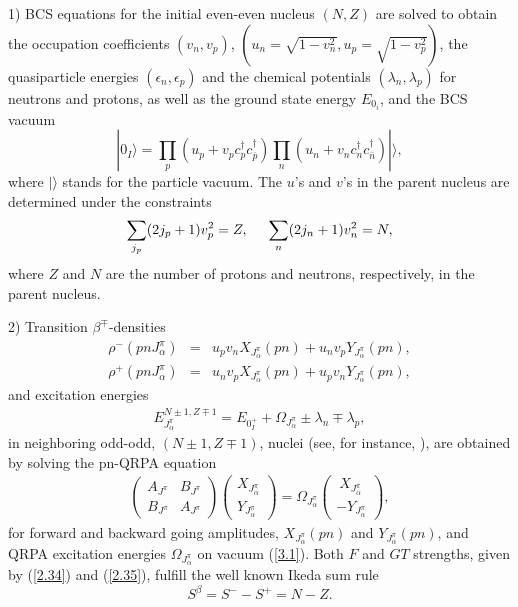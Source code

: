 \documentclass[nofootinbib,twocolumn,eqsecnum,floats,aps]{revtex4}
\def\e {{\epsilon}}
\def\nn{\nonumber }
\def\nn{\nonumber }
\def\be{\begin{equation}}
\def\ee{\end{equation}}
\def\br{\begin{eqnarray}}
\def\e {{\epsilon}}
\def\ket#1{|#1 \rangle}
\def\rf#1{{(\ref{#1})}}
\def\a {{\alpha}}
\def\b {{\beta}}
\begin{document}
1)  BCS equations  for the initial  even-even nucleus $(N,Z)$ are solved to obtain
the occupation coefficients $(v_n,v_p)$, $(u_n=\sqrt{1-v_n^2},u_p=\sqrt{1-v_p^2})$, the quasiparticle energies $(\e_n,\e_p)$
and the chemical potentials $(\lambda_n,\lambda_p)$ for  neutrons and protons, as well as the ground state energy  $E_{0_i}$,
and the BCS vacuum
\be
\ket{0_I}=\prod_p(u_p+v_pc_p^\dag c_{\bar p}^\dag)\prod_n(u_n+v_nc_n^\dag c_{\bar n}^\dag)\ket{},
\label{3.1} \ee
 where $\ket{}$ stands for the particle vacuum. The $u$'s and $v$'s in the parent  nucleus are determined under the constraints
\be
\sum_{j_p}(2j_p+1) v_{p}^2=Z,\hspace{0.5cm}\sum_{n}(2j_n+1) v_{n}^2=N,
\label{3.2} \ee
where $Z$ and $N$ are the number of protons and neutrons, respectively, in the parent nucleus.%

2) Transition $\b^\mp $-densities
\begin{eqnarray}
\rho^{-}(pnJ_\a^\pi)&=&u_{p}v_{n}X_{J_\a^\pi}(pn)+u_{n}v_{p}Y_{J_\a^\pi}(pn),
\nn\\
\rho^{+}(pnJ_\a^\pi)&=&u_{n}v_{p}X_{J_\a^\pi}(pn)+u_pv_nY_{J_\a^\pi}(pn),
\label{3.3}
\end{eqnarray}
and  excitation energies
\br
E^{N\pm 1,Z\mp 1}_{J_\a^\pi}=E_{0^+_I}+\Omega _{J^\pi_{\a}}\pm \lambda_n\mp \lambda_p,
\label{3.4}
\end{eqnarray}
in  neighboring odd-odd, $(N\pm1,Z\mp1)$,  nuclei (see, for instance, \cite[Sec. 6.3.4]{Ri80}),
are obtained by solving the pn-QRPA equation
\begin{eqnarray}
\left(\begin{array}{ll} A_{J^\pi} & B_{J^\pi} \\  B_{J^\pi} &
A_{J^\pi}\end{array}\right) \left(\begin{array}{l} X_{J^\pi_{\a}}
 \\ Y_{J^\pi_{\a}} \end{array}\right) =
\Omega _{J^\pi_{\a}}\left(\begin{array}{l} ~X_{J^\pi_{\a}} \\-Y_{J^\pi_{\a}} \end{array}\right),
\label{3.5} \end{eqnarray}
for forward  and backward going  amplitudes, $X_{J^\pi_{\a}}(pn)$ and  $ Y_{J^\pi_{\a}}(pn)$, and
QRPA excitation energies ${\Omega}_{ J^{\pi}_\alpha}$ on   vacuum \rf{3.1}.
Both  $F$ and $GT$ strengths, given by \rf{2.34} and \rf{2.35}, fulfill the well known Ikeda sum rule
\be
S^{\b}=S^--S^+=N-Z.
\label{3.6}\ee
\end{document}
